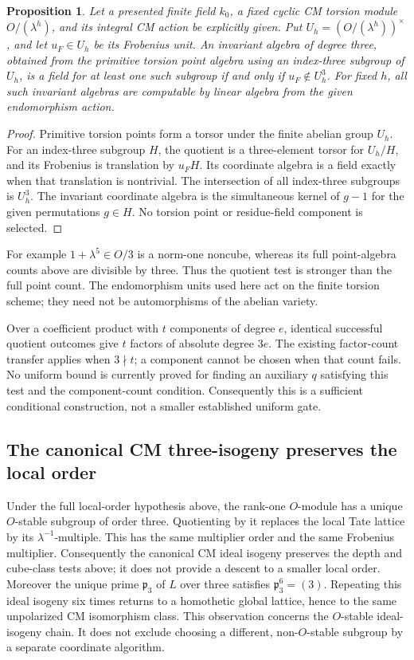 \documentclass[11pt]{article}
\newtheorem{proposition}[theorem]{Proposition}
\theoremstyle{definition}
\theoremstyle{remark}
\begin{document}
\begin{proposition}\label{prop:kummer-cm-unit-quotient}
Let a presented finite field \(k_0\), a fixed cyclic CM torsion
module \(O/(\lambda^h)\), and its integral CM action be
explicitly given. Put \(U_h=(O/(\lambda^h))^\times\),
and let \(u_F\in U_h\) be its Frobenius unit. An invariant
algebra of degree three, obtained from the primitive torsion
point algebra using an index-three subgroup of \(U_h\),
is a field for at least one such subgroup if and only if
\(u_F\notin U_h^3\). For fixed \(h\), all such invariant
algebras are computable by linear algebra from the given
endomorphism action.
\end{proposition}
\begin{proof}
Primitive torsion points form a torsor under the finite abelian
group \(U_h\). For an index-three subgroup \(H\), the
quotient is a three-element torsor for \(U_h/H\), and its
Frobenius is translation by \(u_FH\). Its coordinate algebra
is a field exactly when that translation is nontrivial. The
intersection of all index-three subgroups is \(U_h^3\).
The invariant coordinate algebra is the simultaneous kernel
of \(g-1\) for the given permutations \(g\in H\).
No torsion point or residue-field component is selected.
\end{proof}

For example \(1+\lambda^5\in O/3\) is a norm-one
noncube, whereas its full point-algebra counts above are
divisible by three. Thus the quotient test is stronger than
the full point count. The endomorphism units used here act on
the finite torsion scheme; they need not be automorphisms of
the abelian variety.

Over a coefficient product with \(t\) components of degree
\(e\), identical successful quotient outcomes give \(t\)
factors of absolute degree \(3e\). The existing factor-count
transfer applies when \(3\nmid t\); a component cannot be
chosen when that count fails. No uniform bound is currently
proved for finding an auxiliary \(q\) satisfying this test
and the component-count condition. Consequently this is a
sufficient conditional construction, not a smaller established
uniform gate.

\subsection{The canonical CM three-isogeny preserves the local order}

Under the full local-order hypothesis above, the rank-one
\(O\)-module has a unique \(O\)-stable subgroup of order three.
Quotienting by it replaces the local Tate lattice by its
\(\lambda^{-1}\)-multiple. This has the same multiplier order
and the same Frobenius multiplier. Consequently the canonical
CM ideal isogeny preserves the depth and cube-class tests above;
it does not provide a descent to a smaller local order.
Moreover the unique prime \(\mathfrak p_3\) of \(L\) over
three satisfies \(\mathfrak p_3^6=(3)\). Repeating this ideal
isogeny six times returns to a homothetic global lattice, hence
to the same unpolarized CM isomorphism class. This observation
concerns the \(O\)-stable ideal-isogeny chain. It does not
exclude choosing a different, non-\(O\)-stable subgroup by a
separate coordinate algorithm.
\end{document}
